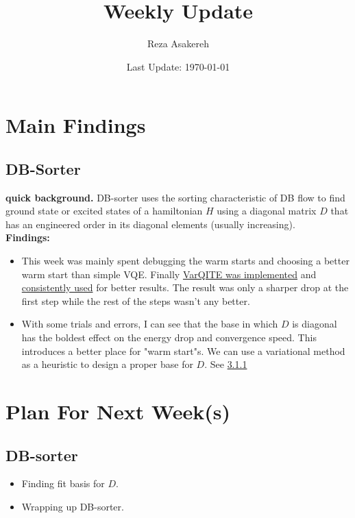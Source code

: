 \documentclass[11pt]{article}
\title{Weekly Update}
\author{Reza Asakereh}
\date{Last Update: \today}
\begin{document}
\maketitle

\section{Main Findings}
\subsection{DB-Sorter}
\textbf{quick background.} DB-sorter uses the sorting characteristic of DB flow to find ground state or excited states of a hamiltonian $H$ using a diagonal matrix $D$ that has an engineered order in its diagonal elements (usually increasing). 
\\

\textbf{Findings:}
\begin{itemize}
    \item This week was mainly spent debugging the warm starts and choosing a better warm start than simple VQE. Finally \href{https://github.com/rasakereh/double-bracket-algo/commit/6cc0a4a5a2879f2dcabb9d4beb3fffece7fb32bc}{VarQITE was implemented} and  \href{https://github.com/rasakereh/double-bracket-algo/commit/3016f4ae45ddad825df3e6b7bd4007539db1cbdc}{consistently used} for better results. The result was only a sharper drop at the first step while the rest of the steps wasn't any better.
    \item With some trials and errors, I can see that the base in which $D$ is diagonal has the boldest effect on the energy drop and convergence speed. This introduces a better place for "warm start"s. We can use a variational method as a heuristic to design a proper base for $D$. See \hyperref[sec:warm-start]{3.1.1}
\end{itemize}


\section{Plan For Next Week(s)}
\subsection{DB-sorter}
\begin{itemize}
    \item Finding fit basis for $D$.
    \item Wrapping up DB-sorter.
\end{itemize}
\end{document}
